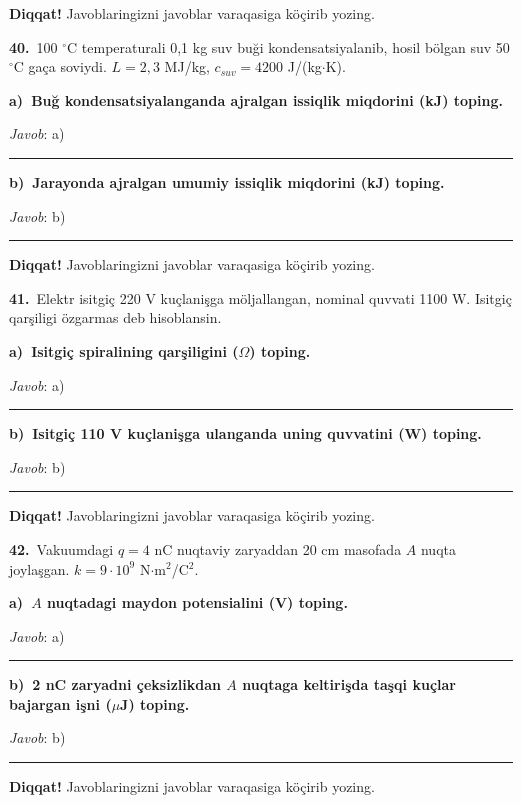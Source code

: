 \documentclass[11pt,a4paper]{article}
\newcommand{\blank}{\rule{5cm}{0.4pt}}
\begin{document}
\medskip\noindent\textbf{Diqqat!} Javoblaringizni javoblar varaqasiga köçirib yozing.\par\vspace{10pt}
\noindent\textbf{40.}\ 100 $^\circ$C temperaturali 0,1 kg suv buği kondensatsiyalanib, hosil bölgan suv 50 $^\circ$C gaça soviydi. $L=2{,}3$ MJ/kg, $c_{suv}=4200$ J/(kg$\cdot$K).\par\smallskip
\medskip\noindent\textbf{a)\ Buğ kondensatsiyalanganda ajralgan issiqlik miqdorini (kJ) toping.}\par
\noindent\textit{Javob}: a)\ \blank\par
\medskip\noindent\textbf{b)\ Jarayonda ajralgan umumiy issiqlik miqdorini (kJ) toping.}\par
\noindent\textit{Javob}: b)\ \blank\par
\medskip\noindent\textbf{Diqqat!} Javoblaringizni javoblar varaqasiga köçirib yozing.\par\vspace{10pt}
\noindent\textbf{41.}\ Elektr isitgiç 220 V kuçlanişga möljallangan, nominal quvvati 1100 W. Isitgiç qarşiligi özgarmas deb hisoblansin.\par\smallskip
\medskip\noindent\textbf{a)\ Isitgiç spiralining qarşiligini ($\Omega$) toping.}\par
\noindent\textit{Javob}: a)\ \blank\par
\medskip\noindent\textbf{b)\ Isitgiç 110 V kuçlanişga ulanganda uning quvvatini (W) toping.}\par
\noindent\textit{Javob}: b)\ \blank\par
\medskip\noindent\textbf{Diqqat!} Javoblaringizni javoblar varaqasiga köçirib yozing.\par\vspace{10pt}
\noindent\textbf{42.}\ Vakuumdagi $q=4$ nC nuqtaviy zaryaddan 20 cm masofada $A$ nuqta joylaşgan. $k=9\cdot10^9$ N$\cdot$m$^2$/C$^2$.\par\smallskip
\medskip\noindent\textbf{a)\ $A$ nuqtadagi maydon potensialini (V) toping.}\par
\noindent\textit{Javob}: a)\ \blank\par
\medskip\noindent\textbf{b)\ 2 nC zaryadni çeksizlikdan $A$ nuqtaga keltirişda taşqi kuçlar bajargan işni ($\mu$J) toping.}\par
\noindent\textit{Javob}: b)\ \blank\par
\medskip\noindent\textbf{Diqqat!} Javoblaringizni javoblar varaqasiga köçirib yozing.\par\vspace{10pt}
\end{document}
